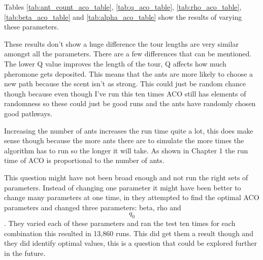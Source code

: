 Tables \ref{tab:ant_count_aco_table}, \ref{tab:q_aco_table}, \ref{tab:rho_aco_table}, \ref{tab:beta_aco_table} and \ref{tab:alpha_aco_table} show the results of varying these parameters. 

These results don't show a huge difference the tour lengths are very similar amongst all the parameters. There are a few differences that can be mentioned. The lower Q value improves the length of the tour, Q affects how much pheromone gets deposited. This means that the ants are more likely to choose a new path because the scent isn't as strong. This could just be random chance though because even though I've run this ten times ACO still has elements of randomness so these could just be good runs and the ants have randomly chosen good pathways.

Increasing the number of ants increases the run time quite a lot, this does make sense though because the more ants there are to simulate the more times the algorithm has to run so the longer it will take. As shown in Chapter 1 the run time of ACO is proportional to the number of ants.

This question might have not been broad enough and not run the right sets of parameters. Instead of changing one parameter it might have been better to change many parameters at one time, in \cite{gaertner_clark} they attempted to find the optimal ACO parameters and changed three parameters: beta, rho and \[q_{0}\]. They varied each of these parameters and ran the test ten times for each combination this resulted in 13,860 runs. This did get them a result though and they did identify optimal values, this is a question that could be explored further in the future. 